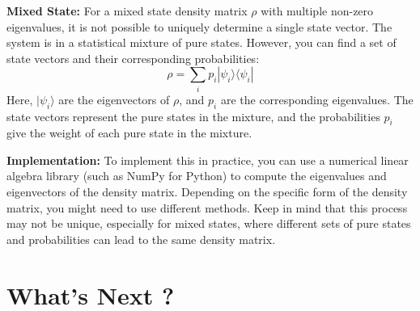 \documentclass{article}
\begin{document}
\textbf{Mixed State:}
For a mixed state density matrix $\rho$ with multiple non-zero eigenvalues, it is not possible to uniquely determine a single state vector. The system is in a statistical mixture of pure states. However, you can find a set of state vectors and their corresponding probabilities:
\[ \rho = \sum_i p_i |\psi_i\rangle\langle\psi_i| \]
Here, $|\psi_i\rangle$ are the eigenvectors of $\rho$, and $p_i$ are the corresponding eigenvalues. The state vectors represent the pure states in the mixture, and the probabilities $p_i$ give the weight of each pure state in the mixture.

\textbf{Implementation:}
To implement this in practice, you can use a numerical linear algebra library (such as NumPy for Python) to compute the eigenvalues and eigenvectors of the density matrix. Depending on the specific form of the density matrix, you might need to use different methods.
Keep in mind that this process may not be unique, especially for mixed states, where different sets of pure states and probabilities can lead to the same density matrix.

\newpage
\section{What's Next ?}

\newpage


\end{document}
